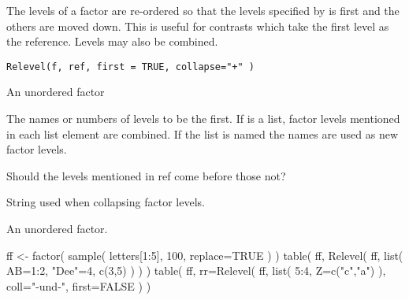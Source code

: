 \begin{Description}\relax
The levels of a factor are re-ordered so that the levels specified by
 is first and the others are moved down. This is useful for
 contrasts which take the first level as the
reference. Levels may also be combined.
\end{Description}
\begin{Usage}
\begin{verbatim}
Relevel(f, ref, first = TRUE, collapse="+" )
\end{verbatim}
\end{Usage}
\begin{Arguments}
\begin{ldescription}
\item[\code{f}] An unordered factor
\item[\code{ref}] The names or numbers of levels to be the first. If 
is a list, factor levels mentioned in each list element are
combined. If the list is named the names are used as new factor levels.
\item[\code{first}] Should the levels mentioned in ref come before those not?
\item[\code{collapse}] String used when collapsing factor levels.
\end{ldescription}
\end{Arguments}
\begin{Value}
An unordered factor.
\end{Value}
\begin{Examples}
\begin{ExampleCode}
ff <- factor( sample( letters[1:5], 100, replace=TRUE ) )
table( ff, Relevel( ff, list( AB=1:2, "Dee"=4, c(3,5) ) ) )
table( ff, rr=Relevel( ff, list( 5:4, Z=c("c","a") ), coll="-und-", first=FALSE ) )
\end{ExampleCode}
\end{Examples}

